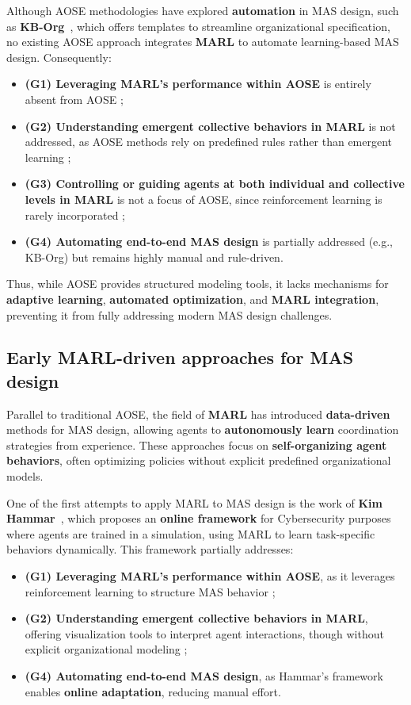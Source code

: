 \documentclass[journal]{IEEEtai}
\begin{document}
Although AOSE methodologies have explored \textbf{automation} in MAS design, such as \textbf{KB-Org}~\cite{kborg2001}, which offers templates to streamline organizational specification, no existing AOSE approach integrates \textbf{MARL} to automate learning-based MAS design. Consequently:
%
\begin{itemize}
    \item \textbf{(G1) Leveraging MARL's performance within AOSE} is entirely absent from AOSE ;
    \item \textbf{(G2) Understanding emergent collective behaviors in MARL} is not addressed, as AOSE methods rely on predefined rules rather than emergent learning ;
    \item \textbf{(G3) Controlling or guiding agents at both individual and collective levels in MARL} is not a focus of AOSE, since reinforcement learning is rarely incorporated ;
    \item \textbf{(G4) Automating end-to-end MAS design} is partially addressed (e.g., KB-Org) but remains highly manual and rule-driven.
\end{itemize}

Thus, while AOSE provides structured modeling tools, it lacks mechanisms for \textbf{adaptive learning}, \textbf{automated optimization}, and \textbf{MARL integration}, preventing it from fully addressing modern MAS design challenges.

\subsection{Early MARL-driven approaches for MAS design}\label{sub-sec:marl_rel}

Parallel to traditional AOSE, the field of \textbf{MARL} has introduced \textbf{data-driven} methods for MAS design, allowing agents to \textbf{autonomously learn} coordination strategies from experience. These approaches focus on \textbf{self-organizing agent behaviors}, often optimizing policies without explicit predefined organizational models.

One of the first attempts to apply MARL to MAS design is the work of \textbf{Kim Hammar}~\cite{hammar2019}, which proposes an \textbf{online framework} for Cybersecurity purposes where agents are trained in a simulation, using MARL to learn task-specific behaviors dynamically. This framework partially addresses:
%
\begin{itemize}
    \item \textbf{(G1) Leveraging MARL's performance within AOSE}, as it leverages reinforcement learning to structure MAS behavior ;
    \item \textbf{(G2) Understanding emergent collective behaviors in MARL}, offering visualization tools to interpret agent interactions, though without explicit organizational modeling ;
    \item \textbf{(G4) Automating end-to-end MAS design}, as Hammar's framework enables \textbf{online adaptation}, reducing manual effort.
\end{itemize}
\end{document}
